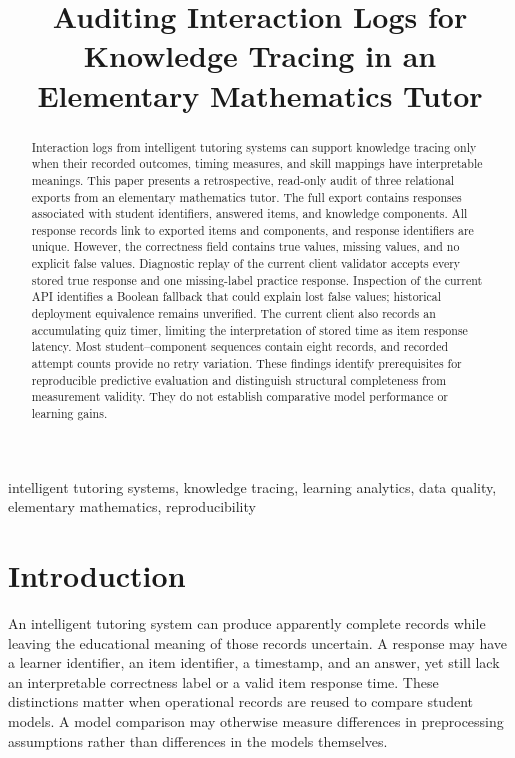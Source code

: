 \documentclass[conference]{IEEEtran}
\newif\ifworkingdraft
\newcommand{\draftnote}[1]{\ifworkingdraft\par\noindent\textcolor{red}{\textbf{Author review:} #1}\par\fi}
\begin{document}
\title{Auditing Interaction Logs for Knowledge Tracing in an Elementary Mathematics Tutor}
\author{}
\maketitle
\draftnote{Working draft for review, not a submission-ready paper. Confirm the retrospective audit research direction, participant/cohort description, ethics reference, historical deployed version, and the overlap statement before submission. No predictive model comparison has been performed.}

\begin{abstract}
Interaction logs from intelligent tutoring systems can support knowledge tracing only when their recorded outcomes, timing measures, and skill mappings have interpretable meanings. This paper presents a retrospective, read-only audit of three relational exports from an elementary mathematics tutor. The full export contains \ResponseCount{} responses associated with \StudentIDCount{} student identifiers, \ObservedItemCount{} answered items, and \ObservedKCCount{} knowledge components. All response records link to exported items and components, and response identifiers are unique. However, the correctness field contains \TrueCount{} true values, \BlankCount{} missing values, and no explicit false values. Diagnostic replay of the current client validator accepts every stored true response and one missing-label practice response. Inspection of the current API identifies a Boolean fallback that could explain lost false values; historical deployment equivalence remains unverified. The current client also records an accumulating quiz timer, limiting the interpretation of stored time as item response latency. Most student--component sequences contain eight records, and recorded attempt counts provide no retry variation. These findings identify prerequisites for reproducible predictive evaluation and distinguish structural completeness from measurement validity. They do not establish comparative model performance or learning gains.
\end{abstract}
\begin{IEEEkeywords}
intelligent tutoring systems, knowledge tracing, learning analytics, data quality, elementary mathematics, reproducibility
\end{IEEEkeywords}

\section{Introduction}
An intelligent tutoring system can produce apparently complete records while leaving the educational meaning of those records uncertain. A response may have a learner identifier, an item identifier, a timestamp, and an answer, yet still lack an interpretable correctness label or a valid item response time. These distinctions matter when operational records are reused to compare student models. A model comparison may otherwise measure differences in preprocessing assumptions rather than differences in the models themselves.
\end{document}
